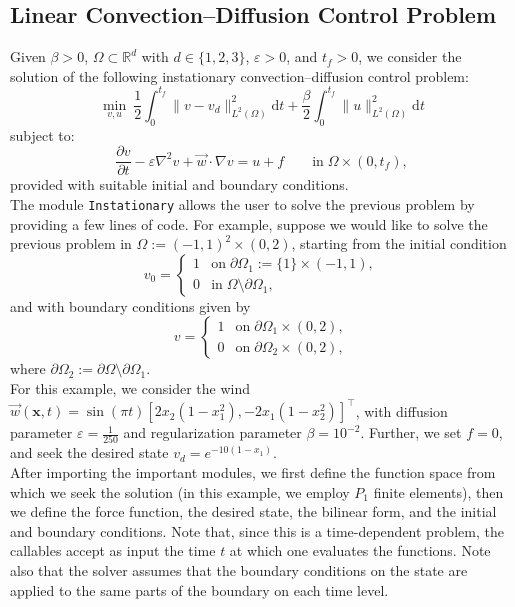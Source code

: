 \documentclass[letterpaper,10pt,english]{sphinxmanual}
\begin{document}
\subsection{Linear Convection--Diffusion Control Problem}
Given $\beta>0$, $\Omega \subset \mathbb{R}^d$ with $d \in \{1, 2, 3 \}$, $\varepsilon > 0$, and $t_f>0$, we consider the solution of the following instationary convection–diffusion control problem:
\begin{displaymath}
\min_{v,u} ~ \frac{1}{2} \int_0^{t_f} \| v - v_d \|^2_{L^2(\Omega)} \mathrm{d}t + \frac{\beta}{2} \int_0^{t_f} \| u \|^2_{L^2(\Omega)} \mathrm{d}t
\end{displaymath}
subject to:
\begin{displaymath}
\frac{\partial v}{\partial t} -\varepsilon \nabla^2 v + \vec{w} \cdot \nabla v = u + f \qquad \mathrm{in} \; \Omega \times (0, t_f),
\end{displaymath}
provided with suitable initial and boundary conditions.\\
The module \texttt{Instationary} allows the user to solve the previous problem by providing a few lines of code. For example, suppose we would like to solve the previous problem in $\Omega := (-1, 1)^2 \times (0, 2)$, starting from the initial condition
\begin{displaymath}
v_0 =
\left\{
\begin{array}{ll}
1 & \mathrm{on} \; \partial \Omega_1 := \{1\} \times (-1,1),\\
0 & \mathrm{in} \; \Omega \setminus \partial \Omega_1,
\end{array}
\right.
\end{displaymath}
and with boundary conditions given by
\begin{displaymath}
v =
\left\{
\begin{array}{ll}
1 & \mathrm{on} \; \partial \Omega_1 \times (0, 2),\\
0 & \mathrm{on} \; \partial \Omega_2 \times (0, 2),
\end{array}
\right.
\end{displaymath}
where $\partial \Omega_2 := \partial\Omega \setminus \partial \Omega_1$.\\
For this example, we consider the wind $\vec{w}(\mathbf{x}, t) = \sin (\pi t)[2 x_2 (1-x_1^2), -2 x_1 (1- x_2^2)]^\top$, with diffusion parameter $\varepsilon = \frac{1}{250}$ and regularization parameter $\beta = 10^{-2}$. Further, we set $f=0$, and seek the desired state $v_d = e^{-10(1-x_1)}$.\\
After importing the important modules, we first define the function space from which we seek the solution (in this example, we employ $P_1$ finite elements), then we define the force function, the desired state, the bilinear form, and the initial and boundary conditions. Note that, since this is a time-dependent problem, the callables accept as input the time $t$ at which one evaluates the functions. Note also that the solver assumes that the boundary conditions on the state are applied to the same parts of the boundary on each time level.
\end{document}

